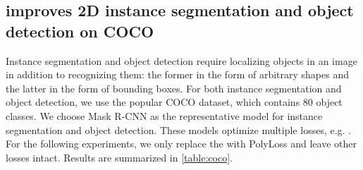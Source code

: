 \vspace{-8pt}
\subsection{\texorpdfstring{}{} improves 2D instance segmentation and object detection on COCO}
\vspace{-5pt}

Instance segmentation and object detection require localizing objects in an image in addition to recognizing them: the former in the form of arbitrary shapes and the latter in the form of bounding boxes. 
For both instance segmentation and object detection, we use the popular COCO \citep{lin2014microsoft} dataset, which contains 80 object classes.
We choose Mask R-CNN \citep{he2017mask} as the representative model for instance segmentation and object detection.
These models optimize multiple losses, e.g. . For the following experiments, we only replace the  with PolyLoss and leave other losses intact. Results are summarized in \autoref{table:coco}.

\begin{table}[!t]\centering
\vspace{-20pt}
\vspace{-5pt}
\caption{\textbf{PolyLoss improves detection results on COCO \textit{validation set}.} Bounding box and instance segmentation mask average-precision (AP) and average-recall (AR) are reported for Mask R-CNN model with a ResNet-50 backbone. Mean and stdev of three runs are reported. }
\label{table:coco}
\vspace{-18pt}
\end{table}

